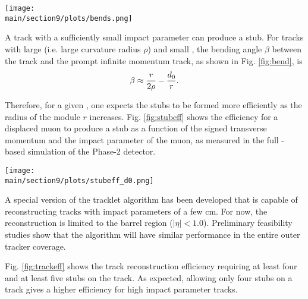 \begin{figure*}[hbtp]\centering
 \texttt{[image: \\main/section9/plots/bends.png]}
 \caption{A sketch of a track crossing a \pt-module.}
  \label{fig:bend}
\end{figure*}%

A track with a sufficiently small impact parameter can produce a stub.
For tracks with large \pt (i.e. large curvature radius $\rho$) and small \dtrans,
the bending angle $\beta$ between the track and the prompt infinite momentum track, as shown in Fig. \ref{fig:bend}, is
\begin{equation*}
  \beta \approx \frac{r}{2\rho} - \frac{d_0}{r}.
\end{equation*}

Therefore, for a given \dtrans, one expects the stubs to be formed more efficiently as the radius of the module $r$ increases.
Fig. \ref{fig:stubeff} shows the efficiency for a displaced muon to produce a stub as a function of the signed transverse momentum and the impact parameter
of the muon, as measured in the full \GEANTfour-based simulation of the Phase-2 detector. 

\begin{figure*}[hbtp]\centering
 \texttt{[image: \\main/section9/plots/stubeff\_d0.png]}
 \caption{The efficiency for a displaced muon to form stubs in the six barrel layers of the Phase-2 tracker, as a function of the signed muon \pt and impact parameter.
 The top row shows, from left to right, layers 1, 2, and 3;
 the bottom row shows layers 4, 5, and 6.
 The sample is comprised of 2000 muons generated with uniformly distributed transverse momentum between 2 and 8\UGeV and pseudorapidity $|\eta|<1$, and with the impact parameter \dtrans
 distributed as a Gaussian with width of 2\Ucm.}
  \label{fig:stubeff}
\end{figure*}

A special version of the tracklet algorithm \cite{cmstdr-014} has been developed that is capable of reconstructing tracks with impact parameters of a few cm.
For now, the reconstruction is limited to the barrel region ($|\eta|<1.0$). Preliminary feasibility studies show
that the algorithm will have similar performance in the entire outer tracker coverage. 

Fig. \ref{fig:trackeff} shows the track reconstruction efficiency requiring at least four and at least five stubs on the track. As expected, allowing
only four stubs on a track gives a higher efficiency for high impact parameter tracks.

